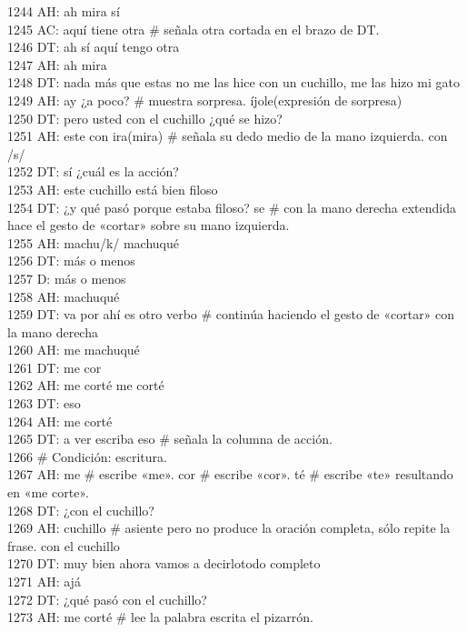 1244 AH: ah mira sí\\
1245 AC: aquí tiene otra # señala otra cortada en el brazo de DT.\\
1246 DT: ah sí aquí tengo otra\\
1247 AH: ah mira\\
1248 DT: nada más que estas no me las hice con un cuchillo, me las hizo mi gato\\
1249 AH: ay ¿a poco? # muestra sorpresa. íjole(expresión de sorpresa)\\
1250 DT: pero usted con el cuchillo ¿qué se hizo?\\
1251 AH: este con ira(mira) # señala su dedo medio de la mano izquierda. con /s/\\
1252 DT: sí ¿cuál es la acción?\\
1253 AH: este cuchillo está bien filoso\\
1254 DT: ¿y qué pasó porque estaba filoso? se # con la mano derecha extendida hace el gesto de «cortar» sobre su mano izquierda.\\
1255 AH: machu/k/ machuqué\\
1256 DT: más o menos\\
1257 D: más o menos\\
1258 AH: machuqué\\
1259 DT: va por ahí es otro verbo # continúa haciendo el gesto de «cortar» con la mano derecha\\
1260 AH: me machuqué\\
1261 DT: me cor\\
1262 AH: me corté me corté\\
1263 DT: eso\\
1264 AH: me corté\\
1265 DT: a ver escriba eso # señala la columna de acción.\\
1266 # Condición: escritura.\\
1267 AH: me # escribe «me». cor # escribe «cor». té # escribe «te» resultando en «me corte».\\
1268 DT: ¿con el cuchillo?\\
1269 AH: cuchillo # asiente pero no produce la oración completa, sólo repite la frase. con el cuchillo\\
1270 DT: muy bien ahora vamos a decirlotodo completo\\
1271 AH: ajá\\
1272 DT: ¿qué pasó con el cuchillo?\\
1273 AH: me corté # lee la palabra escrita el pizarrón.\\
